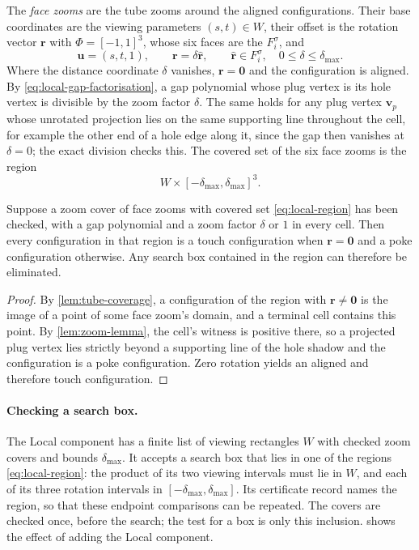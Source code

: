 The \emph{face zooms} are the tube zooms around the aligned
configurations. Their base coordinates are the viewing parameters
$(s,t)\in W$, their offset is the rotation vector $\mathbf r$ with
$\Phi={[-1,1]}^3$, whose six faces are the $F_i^\sigma$, and
\[
  \mathbf u=(s,t,1),\qquad \mathbf r=\delta\widehat{\mathbf r},
  \qquad \widehat{\mathbf r}\in F_i^\sigma,\quad 0\le\delta\le\delta_{\max}.
\]
Where the distance coordinate $\delta$ vanishes, $\mathbf r=\mathbf0$ and the
configuration is aligned. By \cref{eq:local-gap-factorisation}, a gap
polynomial whose plug vertex is its hole vertex is divisible by the zoom
factor $\delta$. The same holds for any plug vertex $\mathbf v_p$ whose
unrotated projection lies on the same supporting line throughout the cell,
for example the other end of a hole edge along it, since the gap then
vanishes at $\delta=0$; the exact division checks this. The covered set of
the six face zooms is the region
\begin{equation}\label{eq:local-region}
  W\times{[-\delta_{\max},\delta_{\max}]}^3 .
\end{equation}

\begin{proposition}\label{prop:soundness-of-the-local-component}
  Suppose a zoom cover of face zooms with covered set \cref{eq:local-region}
  has been checked, with a gap polynomial and a zoom factor $\delta$ or $1$ in
  every cell. Then every configuration in that region is a touch
  configuration when $\mathbf r=\mathbf0$ and a poke configuration
  otherwise. Any search box contained in the region can therefore be
  eliminated.
\end{proposition}
\begin{proof}
  By \cref{lem:tube-coverage}, a configuration of the region with
  $\mathbf r\ne\mathbf0$ is the image of a point of some face zoom's domain,
  and a terminal cell contains this point. By \cref{lem:zoom-lemma}, the
  cell's witness is positive there, so a projected plug vertex lies strictly
  beyond a supporting line of the hole shadow and the configuration is a
  poke configuration. Zero rotation yields an aligned and therefore touch
  configuration.
\end{proof}

\paragraph{Checking a search box.}
The Local component has a finite list of viewing rectangles $W$ with
checked zoom covers and bounds $\delta_{\max}$. It accepts a search box that
lies in one of the regions \cref{eq:local-region}: the product of its two
viewing intervals must lie in $W$, and each of its three rotation intervals
in $[-\delta_{\max},\delta_{\max}]$. Its certificate record names the
region, so that these endpoint comparisons can be repeated. The covers are
checked once, before the search; the test for a box is only this
inclusion.  shows the effect of adding the Local
component.

